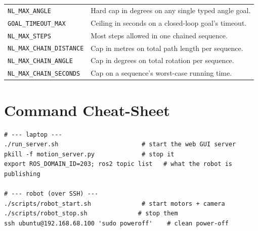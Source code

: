 \documentclass[11pt,a4paper]{article}
\newcommand{\code}[1]{\texttt{#1}}
\begin{document}
\begin{table}[h]
\begin{tabular}{@{}ll@{}}
\code{NL\_MAX\_ANGLE}   & Hard cap in degrees on any single typed angle goal. \\
\code{GOAL\_TIMEOUT\_MAX}& Ceiling in seconds on a closed-loop goal's timeout. \\
\code{NL\_MAX\_STEPS}   & Most steps allowed in one chained sequence. \\
\code{NL\_MAX\_CHAIN\_DISTANCE}& Cap in metres on total path length per sequence. \\
\code{NL\_MAX\_CHAIN\_ANGLE}& Cap in degrees on total rotation per sequence. \\
\code{NL\_MAX\_CHAIN\_SECONDS}& Cap on a sequence's worst-case running time. \\
\bottomrule
\end{tabular}
\end{table}

\section{Command Cheat-Sheet}
\begin{lstlisting}[style=bash]
# --- laptop ---
./run_server.sh                       # start the web GUI server
pkill -f motion_server.py             # stop it
export ROS_DOMAIN_ID=203; ros2 topic list   # what the robot is publishing

# --- robot (over SSH) ---
./scripts/robot_start.sh              # start motors + camera
./scripts/robot_stop.sh              # stop them
ssh ubuntu@192.168.68.100 'sudo poweroff'    # clean power-off
\end{lstlisting}
\end{document}
